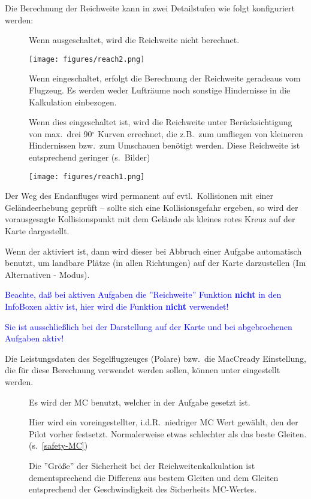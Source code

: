 Die Berechnung der Reichweite  kann in zwei Detailstufen  wie folgt konfiguriert werden:

\begin{description}
\item[] Wenn ausgeschaltet, wird die Reichweite nicht berechnet.
\begin{center}
\texttt{[image: figures/reach2.png]}
\end{center}
\item[] Wenn eingeschaltet, erfolgt die Berechnung der Reichweite geradeaus vom Flugzeug. Es werden weder Lufträume noch sonstige Hindernisse in die Kalkulation einbezogen.
 \item[] Wenn dies eingeschaltet ist, wird die Reichweite unter Berücksichtigung von max.\ drei 90$^\circ$ Kurven errechnet, die z.B.\ zum umfliegen von kleineren Hindernissen bzw.\ zum Umschauen benötigt werden. Diese Reichweite ist entsprechend geringer (s.\ Bilder)
\begin{center}
\texttt{[image: figures/reach1.png]}
\end{center}
\end{description}

Der Weg des Endanfluges wird permanent auf evtl.\ Kollisionen mit einer Geländeerhebung geprüft -- sollte sich eine Kollisionsgefahr ergeben, so wird der vorausgesagte Kollisionspunkt mit dem Gelände als kleines rotes Kreuz auf der Karte dargestellt.

Wenn der  aktiviert ist, dann wird dieser bei Abbruch einer Aufgabe  automatisch benutzt, um landbare Plätze (in allen Richtungen) auf der Karte darzustellen (Im Alternativen - Modus).


\textcolor{blue}{Beachte, daß bei aktiven Aufgaben die ''Reichweite'' Funktion   \textbf{nicht} in den InfoBoxen aktiv ist, hier wird die Funktion \textbf{nicht} verwendet!}\warning 


\textcolor{blue}{Sie ist ausschließlich bei der Darstellung auf der Karte und bei abgebrochenen Aufgaben aktiv!}

Die Leistungsdaten des Segelflugzeuges (Polare) bzw.\ die MacCready Einstellung, die für diese Berechnung verwendet werden sollen, können unter %
 eingestellt werden. 
\begin{description}
\item[] Es wird der MC benutzt, welcher in der Aufgabe gesetzt ist.
\item[] Hier wird ein voreingestellter, i.d.R.\ niedriger MC Wert gewählt, den der Pilot vorher festsetzt. Normalerweise etwas schlechter als das beste Gleiten. (s.~\ref{safety-MC}) 

Die ''Größe'' der Sicherheit bei der Reichweitenkalkulation ist dementsprechend   die Differenz aus bestem Gleiten und dem Gleiten entsprechend der Geschwindigkeit des Sicherheits MC-Wertes.
\end{description}
